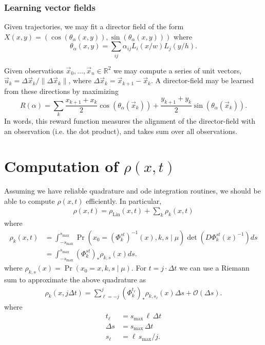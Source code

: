 \documentclass[12pt]{amsart}
\DeclareMathOperator{\Lin}{Lin}
\begin{document}
\subsubsection{Learning vector fields}
Given trajectories, we may fit a director field of the form $X(x,y) = ( \cos( \theta_\alpha(x,y) ) , \sin( \theta_\alpha(x,y) ) )$
where 
$$
	\theta_\alpha(x,y) = \sum_{ij} \alpha_{ij} L_i(x / w) L_j(y / h).
$$


Given observations $\vec{x}_0,  \dots, \vec{x}_n \in \mathbb{R}^2$ we may compute a series of unit vectors, $\vec{u}_k = \Delta \vec{x}_k / \| \Delta \vec{x}_k  \|$,
where $\Delta \vec{x}_k = \vec{x}_{k+1} - \vec{x}_k$.
A director-field may be learned from these directions by maximizing
$$
	R(\alpha ) = \sum_{k} \frac{x_{k+1} + x_k}{2} \cos( \theta_\alpha(\vec{x}_k) ) + \frac{y_{k+1} + y_k}{2}  \sin( \theta_\alpha( \vec{x}_k ) ).
$$
In words, this reward function measures the alignment of the director-field with an observation (i.e. the dot product), and takes sum over all observations.

\section{Computation of $\rho(x,t)$}
Assuming we have reliable quadrature and ode integration routines, we should be able to compute $\rho(x,t)$ efficiently.
In particular,
\begin{align*}
	\rho(x,t) = \rho_{\Lin}(x,t) +  \sum_{k} \rho_k(x,t)
\end{align*}
where
\begin{align*}
	\rho_k(x,t) &= \int_{-s_{\max}}^{s_{\max}} \Pr( x_0 = (\Phi_k^{st})^{-1}(x) , k , s \mid \mu ) \det( D\Phi_k^{st}(x)^{-1} ) ds \\
		&= \int_{-s_{\max}}^{ s_{\max}} (\Phi_{k}^{st})_* \rho_{k,s}(x) ds.
\end{align*}
where $\rho_{k,s}(x) =  \Pr( x_0 =x , k , s \mid \mu )$.
For $t = j \cdot \Delta t$ we can use a Riemann sum to approximate the above quadrature as
\begin{align*}
	\rho_k(x, j \Delta t) = \sum_{\ell = -j}^{j} (\Phi_{k}^{ t_\ell } )_* \rho_{k,s_\ell}(x) \Delta s + \mathcal{O}( \Delta s ).
\end{align*}
where
\begin{align*}
	t_\ell &= s_{\max}\, \ell \, \Delta t \\
	\Delta s &= s_{\max} \, \Delta t \\
	s_\ell &= \ell \, s_{\max} / j.
\end{align*}
\end{document}
